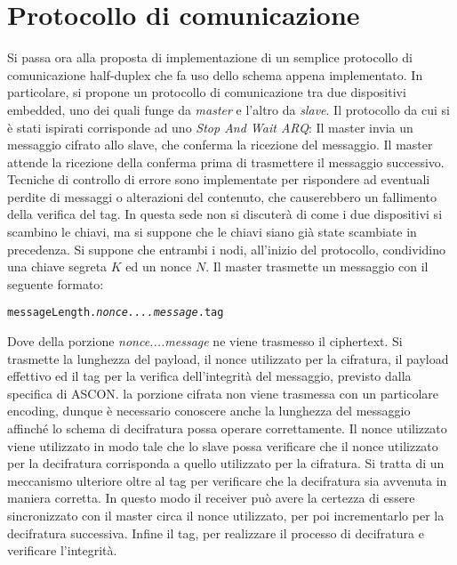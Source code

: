 \section{Protocollo di comunicazione}
Si passa ora alla proposta di implementazione di un semplice protocollo di comunicazione half-duplex che fa uso dello schema appena implementato. 
\newline\newline
In particolare, si propone un protocollo di comunicazione tra due dispositivi embedded, uno dei quali funge da \textsl{master} e l'altro da \textsl{slave}. Il protocollo da cui si è stati ispirati corrisponde ad uno \textsl{Stop And Wait ARQ}: Il master invia un messaggio cifrato allo slave, che conferma la ricezione del messaggio. Il master attende la ricezione della conferma prima di trasmettere il messaggio successivo. Tecniche di controllo di errore sono implementate per rispondere ad eventuali perdite di messaggi o alterazioni del contenuto, che causerebbero un fallimento della verifica del tag. 
\newline\newline
In questa sede non si discuterà di come i due dispositivi si scambino le chiavi, ma si suppone che le chiavi siano già state scambiate in precedenza. Si suppone che entrambi i nodi, all'inizio del protocollo, condividino una chiave segreta $K$ ed un nonce $N$.
\newline\newline
Il master trasmette un messaggio con il seguente formato: 
\begin{center}
    \texttt{messageLength.\textsl{nonce....message}.tag}
\end{center}
Dove della porzione \textsl{nonce....message} ne viene trasmesso il ciphertext. 
\newline
Si trasmette la lunghezza del payload, il nonce utilizzato per la cifratura, il payload effettivo ed il tag per la verifica dell'integrità del messaggio, previsto dalla specifica di ASCON. la porzione cifrata non viene trasmessa con un particolare encoding, dunque è necessario conoscere anche la lunghezza del messaggio affinché lo schema di decifratura possa operare correttamente. Il nonce utilizzato viene utilizzato in modo tale che lo slave possa verificare che il nonce utilizzato per la decifratura corrisponda a quello utilizzato per la cifratura. Si tratta di un meccanismo ulteriore oltre al tag per verificare che la decifratura sia avvenuta in maniera corretta. In questo modo il receiver può avere la certezza di essere sincronizzato con il master circa il nonce utilizzato, per poi incrementarlo per la decifratura successiva. Infine il tag, per realizzare il processo di decifratura e verificare l'integrità. 
